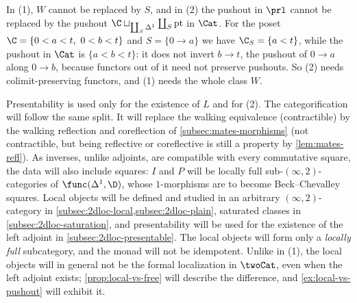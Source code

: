 %
In (1), $W$ cannot be replaced by $S$, and in (2) the pushout in $\prl$ cannot
be replaced by the pushout
$\C \sqcup_{\coprod_{S}\Delta^{1}} \coprod_{S}\mathrm{pt}$
in $\Cat$. For the poset
$\C = \{0 < a < t,\ 0 < b < t\}$
and $S = \{0 \to a\}$ we have $\C_{S} = \{a < t\}$,
while the pushout in $\Cat$ is $\{a < b < t\}$: it does not invert $b \to t$,
the pushout of $0 \to a$ along $0 \to b$,
because functors out of it need not preserve pushouts.
So (2) needs colimit-preserving functors, and (1) needs the whole class $W$.

%
Presentability is used only for the existence of $L$ and for (2).
The categorification will follow the same split.
It will replace the walking equivalence (contractible) by the walking reflection
and coreflection of \cref{subsec:mates-morphisms} (not contractible,
but being reflective or coreflective is still a property by
\cref{lem:mates-refl}). As inverses, unlike adjoints,
are compatible with every commutative square,
the data will also include squares: $I$ and $P$ will be locally full
sub-$(\infty,2)$-categories of $\func(\Delta^{1},\D)$,
whose $1$-morphisms are to become Beck--Chevalley squares.
Local objects will be defined and studied in an arbitrary $(\infty,2)$-category
in \cref{subsec:2dloc-local,subsec:2dloc-plain},
saturated classes in \cref{subsec:2dloc-saturation},
and presentability will be used for the existence of the left adjoint in
\cref{subsec:2dloc-presentable}.
The local objects will form only a \emph{locally full} subcategory,
and the monad will not be idempotent. Unlike in (1),
the local objects will in general not be the formal localization in $\twoCat$,
even when the left adjoint exists; \cref{prop:local-vs-free} will describe the
difference, and \cref{ex:local-vs-pushout} will exhibit it.
